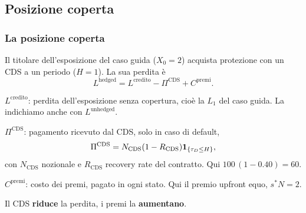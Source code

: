 \subsection{Posizione coperta}%

\begin{frame}%
%

\frametitle{La posizione coperta}%
%

%


Il titolare dell'esposizione del caso guida ($X_{0}=2$) acquista protezione
con un CDS a un periodo ($H=1$). La sua perdita \`{e}
\[
L^{\mathrm{hedged}} = L^{\mathrm{credito}} - \Pi^{\mathrm{CDS}} +
C^{\mathrm{premi}}.
\]


\begin{stepitemize}
\item $L^{\mathrm{credito}}$: perdita dell'esposizione senza copertura,
cio\`{e} la $L_{1}$ del caso guida. La indichiamo anche con
$L^{\mathrm{unhedged}}$.

\item $\Pi^{\mathrm{CDS}}$: pagamento ricevuto dal CDS, solo in caso di
default,
\[
\Pi^{\mathrm{CDS}} = N_{\mathrm{CDS}}(1-R_{\mathrm{CDS}}) \mathbf{1}_{\{\tau_{D}\leq
H\}},
\]
con $N_{\mathrm{CDS}}$ nozionale e $R_{\mathrm{CDS}}$ recovery rate del
contratto. Qui $100\,(1-0.40)=60$.

\item $C^{\mathrm{premi}}$: costo dei premi, pagato in ogni stato. Qui il
premio upfront equo, $s^{*}N=2$.
\end{stepitemize}

\begin{center}
{\small Il CDS \textbf{riduce} la perdita, i premi la \textbf{aumentano}.}
\end{center}

%

\transboxout
\end{frame}%


%

